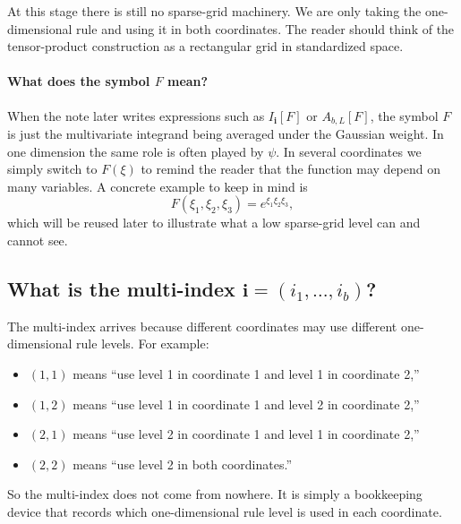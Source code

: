 \documentclass[11pt]{article}
\numberwithin{equation}{section}
\begin{document}
At this stage there is still no sparse-grid machinery.  We are only taking the
one-dimensional rule and using it in both coordinates.  The reader should think
of the tensor-product construction as a rectangular grid in standardized space.

\paragraph{What does the symbol \texorpdfstring{$F$}{F} mean?}
When the note later writes expressions such as \(I_{\mathbf i}[F]\) or
\(A_{b,L}[F]\), the symbol \(F\) is just the multivariate integrand being
averaged under the Gaussian weight.  In one dimension the same role is often
played by \(\psi\).  In several coordinates we simply switch to \(F(\xi)\)
to remind the reader that the function may depend on many variables.  A concrete
example to keep in mind is
\[
  F(\xi_1,\xi_2,\xi_3)=e^{\xi_1\xi_2\xi_3},
\]
which will be reused later to illustrate what a low sparse-grid level can and
cannot see.

\subsection{What is the multi-index \texorpdfstring{\(\mathbf i=(i_1,\ldots,i_b)\)}{i=(i1,...,ib)}?}

The multi-index arrives because different coordinates may use different
one-dimensional rule levels.  For example:
\begin{itemize}[leftmargin=0.28in]
  \item \((1,1)\) means ``use level 1 in coordinate 1 and level 1 in coordinate
  2,''
  \item \((1,2)\) means ``use level 1 in coordinate 1 and level 2 in coordinate
  2,''
  \item \((2,1)\) means ``use level 2 in coordinate 1 and level 1 in coordinate
  2,''
  \item \((2,2)\) means ``use level 2 in both coordinates.''
\end{itemize}
So the multi-index does not come from nowhere.  It is simply a bookkeeping device
that records which one-dimensional rule level is used in each coordinate.
\end{document}
